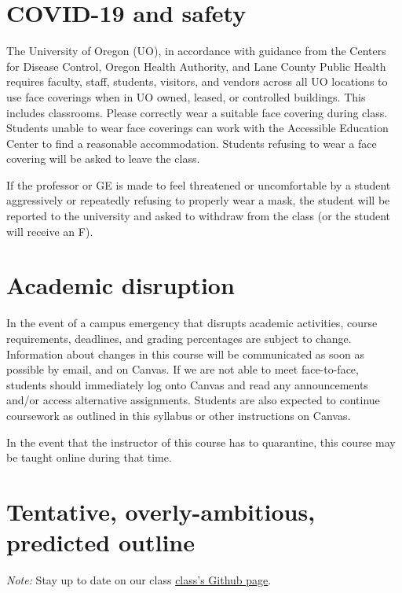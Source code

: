 \documentclass[10pt]{article}
\begin{document}
\section*{COVID-19 and safety}

The University of Oregon (UO), in accordance with guidance from the Centers for Disease Control, Oregon Health
Authority, and Lane County Public Health requires faculty, staff, students, visitors, and vendors across all UO locations to use face coverings when in UO owned, leased, or controlled buildings. This includes classrooms. Please correctly wear a suitable face covering during class. Students unable to wear face coverings can work with the Accessible Education Center to find a reasonable accommodation. Students refusing to wear a face covering will be asked to leave the class. 

If the professor or GE is made to feel threatened or uncomfortable by a student aggressively or repeatedly refusing to properly wear a mask, the student will be reported to the university and asked to withdraw from the class (or the student will receive an F).

\section*{Academic disruption}

In the event of a campus emergency that disrupts academic activities, course requirements, deadlines, and grading
percentages are subject to change. Information about changes in this course will be communicated as soon as possible by email, and on Canvas. If we are not able to meet face-to-face, students should immediately log onto Canvas and read any announcements and/or access alternative assignments. Students are also expected to continue coursework as outlined in this syllabus or other instructions on Canvas.

In the event that the instructor of this course has to quarantine, this course may be taught online during that time.

\newpage

\section*{Tentative, overly-ambitious, predicted outline}

\textit{Note:} Stay up to date on our class \href{https://github.com/edrubin/EC524S24/}{class's Github page}.
\end{document}
